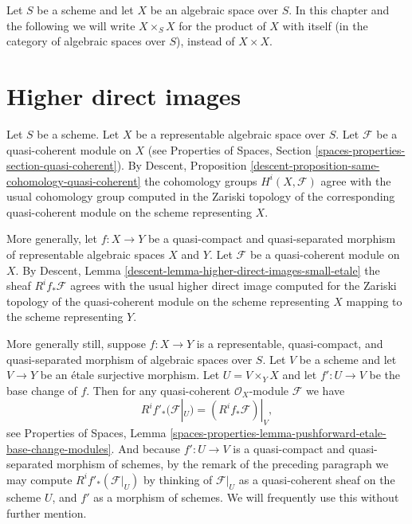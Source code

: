 \medskip\noindent
Let $S$ be a scheme and let $X$ be an algebraic space over $S$.
In this chapter and the following we will write $X \times_S X$
for the product of $X$ with itself (in the category of algebraic
spaces over $S$), instead of $X \times X$.








\section{Higher direct images}
\label{section-higher-direct-image}

\noindent
Let $S$ be a scheme. Let $X$ be a representable algebraic space over $S$.
Let $\mathcal{F}$ be a quasi-coherent module on $X$ (see
Properties of Spaces, Section \ref{spaces-properties-section-quasi-coherent}).
By
Descent, Proposition \ref{descent-proposition-same-cohomology-quasi-coherent}
the cohomology groups $H^i(X, \mathcal{F})$ agree with the usual
cohomology group computed in the Zariski topology of the corresponding
quasi-coherent module on the scheme representing $X$.

\medskip\noindent
More generally, let $f : X \to Y$ be a quasi-compact and quasi-separated
morphism of representable algebraic spaces $X$ and $Y$. Let
$\mathcal{F}$ be a quasi-coherent module on $X$. By
Descent, Lemma \ref{descent-lemma-higher-direct-images-small-etale}
the sheaf $R^if_*\mathcal{F}$ agrees with the
usual higher direct image computed for the Zariski topology
of the quasi-coherent module on the scheme representing $X$
mapping to the scheme representing $Y$.

\medskip\noindent
More generally still, suppose $f : X \to Y$ is a
representable, quasi-compact, and
quasi-separated morphism of algebraic spaces over $S$. Let $V$ be a scheme
and let $V \to Y$ be an \'etale surjective morphism. Let $U = V \times_Y X$
and let $f' : U \to V$ be the base change of $f$. Then for any
quasi-coherent $\mathcal{O}_X$-module $\mathcal{F}$ we have
\begin{equation}
\label{equation-representable-higher-direct-image}
R^if'_*(\mathcal{F}|_U) = (R^if_*\mathcal{F})|_V,
\end{equation}
see
Properties of Spaces,
Lemma \ref{spaces-properties-lemma-pushforward-etale-base-change-modules}.
And because $f' : U \to V$ is a quasi-compact and quasi-separated
morphism of schemes, by the remark of the preceding paragraph we may
compute $R^if'_*(\mathcal{F}|_U)$ by thinking of $\mathcal{F}|_U$ as a
quasi-coherent sheaf on the scheme $U$, and $f'$ as a morphism of schemes.
We will frequently use this without further mention.

